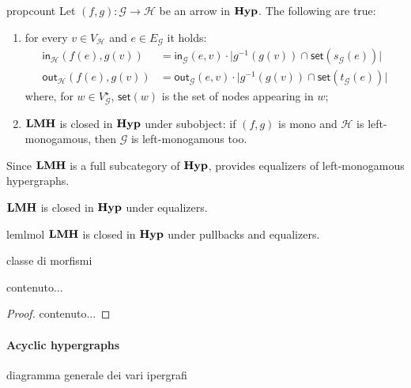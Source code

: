 \documentclass[3p]{elsarticle}
\newcommand{\ind}[1]{\mathsf{in}_{\mathcal{#1}}}
\newcommand{\outd}[1]{\mathsf{out}_{\mathcal{#1}}}
\newcommand{\catname}[1]{\textbf{\textup{#1}}}
\newcommand{\lmo}{\catname{LMH}}
\newcommand{\hyp}{\catname{Hyp}}
\newcommand{\abs}[1]{\lvert #1\rvert}
\theoremstyle{remark}
\theoremstyle{definition}
\begin{document}
\begin{restatable}{prop}{count}\label{prop:count}
	Let $(f,g)\colon \mathcal{G}\to \mathcal{H}$ be an arrow in $\hyp$.
	The following are true:
	\begin{enumerate}
		\item for every $v\in V_{\mathcal{H}}$ and $e\in E_\mathcal{G}$ it holds:
	\begin{align*}\ind{H}(f(e), g(v))&= \ind{G}(e, v)\cdot \abs{g^{-1}(g(v))\cap \mathsf{set}(s_{\mathcal{G}}(e))} \\\outd{H}(f(e), g(v))&= \outd{G}(e, v)\cdot \abs{g^{-1}(g(v))\cap \mathsf{set}(t_{\mathcal{G}}(e))}
	\end{align*}
		where, for $w\in V^\star_{\mathcal{G}}$, $\mathsf{set}(w)$ is the set of nodes appearing in $w$;
		\item $\lmo$ is closed in $\hyp$ under subobject: if $(f, g)$ is mono and $\mathcal{H}$ is left-monogamous, then $\mathcal{G}$ is left-monogamous too.
	\end{enumerate}
\end{restatable}

Since $\lmo$ is a full subcategory of $\hyp$, 
 provides equalizers of left-monogamous hypergraphs.
\begin{cor}\label{cor:eq}
	$\lmo$ is closed in $\hyp$ under equalizers.
\end{cor}


\begin{restatable}{lem}{lmol}
	$\lmo$ is closed in $\hyp$ under pullbacks and equalizers.
\end{restatable}

\begin{defi}
classe di morfismi
\end{defi}

\begin{prop}
	contenuto...
\end{prop}
\begin{proof}
	contenuto...
\end{proof}

\paragraph{Acyclic hypergraphs}\label{sub:ac}





\begin{rem}\label{rem:map1}
	diagramma generale dei vari ipergrafi
\end{rem}
\end{document}
